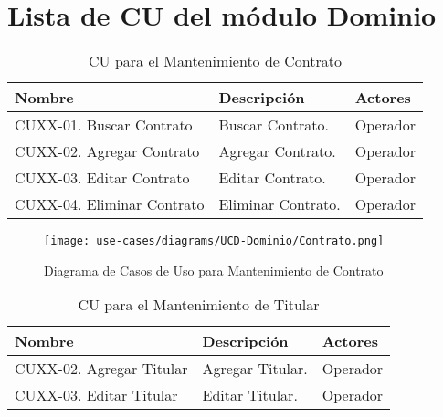 
	\section{Lista de CU del m\'odulo Dominio} \label{sec:uc-dominio}

	\begin{table}[H]
		\caption{CU para el Mantenimiento de Contrato}
		\label{uc-entity-contrato}
		\begin{center}
		\begin{tabularx}{0.90\linewidth}{ X X X }
			\hline
			\textbf{Nombre} & \textbf{Descripci\'on} & \textbf{Actores} \\
			\hline
			CUXX-01. Buscar Contrato & Buscar Contrato. & Operador \\
			CUXX-02. Agregar Contrato & Agregar Contrato. & Operador \\
			CUXX-03. Editar Contrato & Editar Contrato. & Operador \\
			CUXX-04. Eliminar Contrato & Eliminar Contrato. & Operador \\
			\hline
		\end{tabularx}
		\end{center}
	\end{table}
	
	\begin{figure}[H]
		\begin{center}
		\label{tab:ucd-entity-contrato}
		\texttt{[image: use-cases/diagrams/UCD-Dominio/Contrato.png]}
		\caption{Diagrama de Casos de Uso para Mantenimiento de Contrato}
		\end{center}
	\end{figure}
	\begin{table}[H]
		\caption{CU para el Mantenimiento de Titular}
		\label{uc-entity-titularcontrato}
		\begin{center}
		\begin{tabularx}{0.90\linewidth}{ X X X }
			\hline
			\textbf{Nombre} & \textbf{Descripci\'on} & \textbf{Actores} \\
			\hline
			CUXX-02. Agregar Titular & Agregar Titular. & Operador \\
			CUXX-03. Editar Titular & Editar Titular. & Operador \\
			\hline
		\end{tabularx}
		\end{center}
	\end{table}
	
